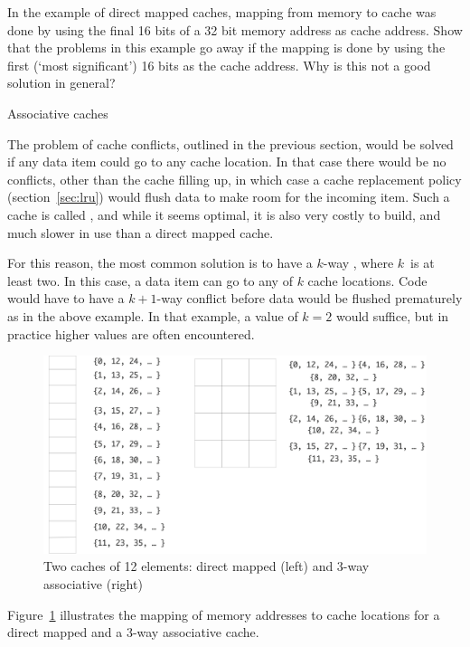 \begin{exercise}
  In the example of direct mapped caches, mapping from memory to cache
  was done by using the final 16 bits of a 32 bit memory address as
  cache address. Show that the problems in this example go away if the
  mapping is done by using the first (`most significant') 16 bits as
  the cache address. Why is this not a good solution in general?
\end{exercise}

 {Associative caches}
\label{sec:associative}

The problem of cache conflicts, outlined in the previous section, would
be solved if any data item could go to any cache location. In that
case there would be no conflicts, other than the cache filling up, in
which case a cache replacement policy (section~\ref{sec:lru}) would
flush data to make room for the incoming item. Such a cache is called
, and while it seems optimal, it is also
very costly to build, and much slower in use than a direct mapped cache.

For this reason, the most common solution is to have a
$k$-way , where $k$~is at least two. In
this case, a data item can go to any of $k$ cache locations. Code
would have to have a $k+1$-way conflict before data would be flushed
prematurely as in the above example. In that example, a value of $k=2$
would suffice, but in practice higher values are often encountered.
\begin{figure}[ht]
\includegraphics[scale=.12]{graphics-public/assoc-mapping}
\caption{Two caches of 12 elements: direct mapped (left) and 3-way associative (right)}
\label{fig:assoc-mapping}
\end{figure}
Figure~\ref{fig:assoc-mapping} illustrates the mapping of memory
addresses to cache locations for a direct mapped and a 3-way associative
cache.

